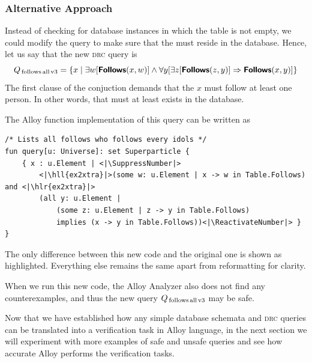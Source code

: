 \begin{example}
    \subsubsection*{Alternative Approach}

    Instead of checking for database instances in which the table  is not empty, we could modify the query to make sure that the  must reside in the database. Hence, let us say that the new \textsc{drc} query is
    \[
        Q_\text{\,follows\,all\,v3} =
            \{ x \mid \exists w [\text{\textnormal{\textsf{\textbf{Follows}}}}(x, w)] \wedge \forall y[ \exists z [\text{\textnormal{\textsf{\textbf{Follows}}}}(z, y)] \Rightarrow \text{\textnormal{\textsf{\textbf{Follows}}}}(x, y)] \}
    \]
    The first clause of the conjuction demands that the  $x$ must follow at least one person. In other words, that  must at least exists in the database.

    The Alloy function implementation of this query can be written as
\begin{lstlisting}[language=alloy,firstnumber=20]
/* Lists all follows who follows every idols */
fun query[u: Universe]: set Superparticle {
    { x : u.Element | <|\SuppressNumber|>
        <|\hll{ex2xtra}|>(some w: u.Element | x -> w in Table.Follows) and <|\hlr{ex2xtra}|>
        (all y: u.Element |
            (some z: u.Element | z -> y in Table.Follows)
            implies (x -> y in Table.Follows))<|\ReactivateNumber|> }
}
\end{lstlisting}
    The only difference between this new code and the original one is shown as highlighted. Everything else remains the same apart from reformatting for clarity.

    When we run this new code, the Alloy Analyzer also does not find any counterexamples, and thus the new query $Q_\text{\,follows\,all\,v3}$ may be safe.
\end{example}

Now that we have established how any simple database schemata and \textsc{drc} queries can be translated into a verification task in Alloy language, in the next section we will experiment with more examples of safe and unsafe queries and see how accurate Alloy performs the verification tasks.
